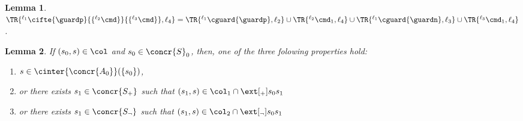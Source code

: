 \documentclass[12pt]{article}
\let\firstunion\cup
\let\firstinter\cap
\let\cup\firstunion
\let\cap\firstinter
\newcommand{\li}[1]{ {}^{\ell_{#1}}  }
\newtheorem{lemma}{Lemma}
\begin{document}
\begin{lemma}\label{lemma:Gif}
 \(\TR{\li1 \cifte{\guardp}{\{\li2\cmd\}}{\{\li3\cmd\}},\ell_4} =
     \TR{\li1 \cguard{\guardp},\ell_2}
 \cup\TR{\li2 \cmd_1,\ell_4}
 \cup\TR{\li1 \cguard{\guardn},\ell_3}
 \cup\TR{\li3 \cmd_1,\ell_4}\). 
\end{lemma}




\begin{lemma}\label{lemma:Cif}
 If \((s_0,s)\in\col\) and \(s_0\in\concr{S}_0\), then, one of the three folowing properties hold:
 \begin{enumerate}
  \item \(s\in\cinter{\concr{A_0}}(\{s_0\})\), 
  \item or there exists \(s_1\in\concr{S_{{+}}}\) such that \((s_1,s)\in\col_{1}\cap\ext[_{{+}}]{s_0}{s_1}\)
  \item or there exists \(s_1\in\concr{S_{{\neg}}}\) such that \((s_1,s)\in\col_{2}\cap\ext[_{{\neg}}]{s_0}{s_1}\)
 \end{enumerate}
\end{lemma}
\end{document}
